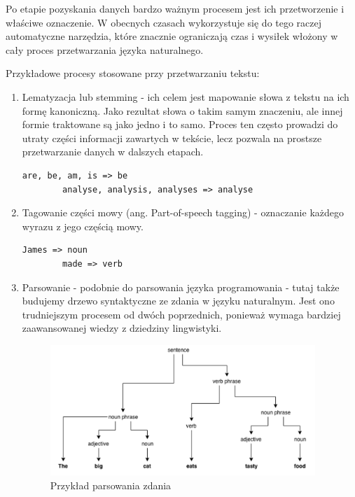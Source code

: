 Po etapie pozyskania danych bardzo ważnym procesem jest ich przetworzenie i właściwe oznaczenie. W obecnych czasach wykorzystuje się do tego raczej automatyczne narzędzia, które znacznie ograniczają czas i wysiłek włożony w cały proces przetwarzania języka naturalnego.

Przykładowe procesy stosowane przy przetwarzaniu tekstu:
\begin{enumerate}
    \item Lematyzacja lub stemming - ich celem jest mapowanie słowa z tekstu na ich formę kanoniczną. Jako rezultat słowa o takim samym znaczeniu, ale innej formie traktowane są jako jedno i to samo. Proces ten często prowadzi do utraty części informacji zawartych w tekście, lecz pozwala na prostsze przetwarzanie danych w dalszych etapach.

    \newpage
    \begin{lstlisting}[caption={Przykład lematyzacji},captionpos=b]
        are, be, am, is => be
        analyse, analysis, analyses => analyse
    \end{lstlisting}
    
    \item Tagowanie części mowy (ang. Part-of-speech tagging) - oznaczanie każdego wyrazu z jego częścią mowy.

    \begin{lstlisting}[caption={Przykład tagowania części mowy}]
        James => noun
        made => verb
    \end{lstlisting}
    
    \item Parsowanie - podobnie do parsowania języka programowania - tutaj także budujemy drzewo syntaktyczne ze zdania w języku naturalnym. Jest ono trudniejszym procesem od dwóch poprzednich, ponieważ wymaga bardziej zaawansowanej wiedzy z dziedziny lingwistyki.

    \begin{figure}[H]
    \includegraphics[width=10cm]{parsing_example.png}
    \centering
    \caption{Przykład parsowania zdania}
    \end{figure} 
    
\end{enumerate}

